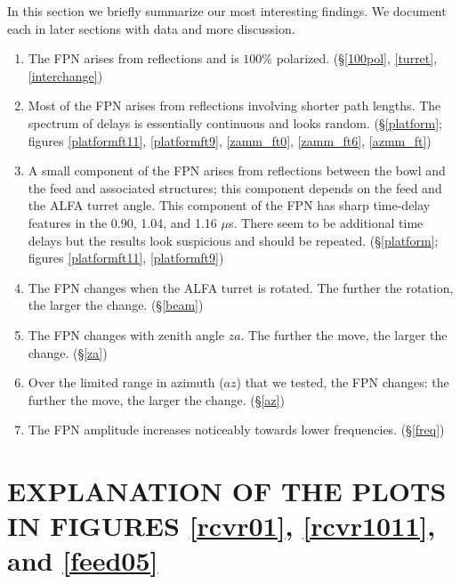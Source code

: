 \documentclass[psfig,preprint]{aastex}
\begin{document}
	In this section we briefly summarize our most interesting
findings. We document each in later sections with data and more
discussion. \begin{enumerate}

	\item The FPN arises from reflections and is $100\%$ polarized.
(\S \ref{100pol}, \ref{turret}, \ref{interchange})

	\item Most of the FPN arises from reflections involving shorter
path lengths.  The spectrum of delays is essentially continuous and
looks random.  (\S \ref{platform}; figures \ref{platformft11},
\ref{platformft9}, \ref{zamm_ft0}, \ref{zamm_ft6}, \ref{azmm_ft}) 

	\item A small component of the FPN arises from reflections
between the bowl and the feed and associated structures; this component
depends on the feed and the ALFA turret angle.  This component of the
FPN has sharp time-delay features in the 0.90, 1.04, and 1.16 $\mu$s. 
There seem to be additional time delays but the results look suspicious
and should be repeated.  (\S \ref{platform}; figures \ref{platformft11},
\ref{platformft9})

	\item The FPN changes when the ALFA turret is rotated. The
further the rotation, the larger the change. (\S \ref{beam})

	\item The FPN changes with zenith angle $za$. The further the
move, the larger the change. (\S \ref{za})

	\item Over the limited range in azimuth ($az$) that we tested,
the FPN changes: the further the move, the larger the change. (\S \ref{az})

	\item The FPN amplitude increases noticeably towards lower
frequencies.  (\S \ref{freq})


\end{enumerate} 
	
\section{EXPLANATION OF THE PLOTS IN FIGURES \ref{rcvr01},
\ref{rcvr1011}, and \ref{feed05}} \label{figexp1}
\end{document}

